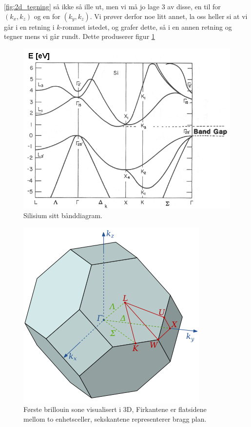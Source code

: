 \autoref{fig:2d_tegning} så ikke så ille ut, men vi må jo lage 3 av disse, en til for $(k_x,k_z)$ og en for $(k_y,k_z)$. Vi prøver derfor noe litt annet, la oss heller si at vi går i en retning i $k$-rommet istedet, og grafer dette, så i en annen retning og tegner mens vi går rundt. Dette produserer figur \ref{fig:si_band}



\begin{figure}[!htb]
    \centering
    \includegraphics[scale=0.55]{Bilder/SamtaleTema6/si_banddiagram.png}
    \caption{Silisium sitt bånddiagram.}
    \label{fig:si_band}
\end{figure}


\begin{figure}[!htb]
    \centering
    \includegraphics[scale=0.55]{Bilder/SamtaleTema6/brillouinZone.png}
    \caption{Første brillouin sone visualisert i 3D, Firkantene er flatsidene mellom to enhetsceller, sekskantene representerer bragg plan.}
    \label{fig:BZ}
\end{figure}

